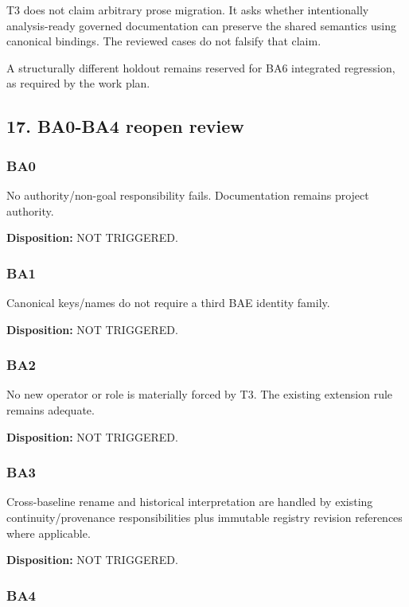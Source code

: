 \documentclass[
  10pt,
  a4paper,
]{article}
\begin{document}
T3 does not claim arbitrary prose migration. It asks whether
intentionally analysis-ready governed documentation can preserve the
shared semantics using canonical bindings. The reviewed cases do not
falsify that claim.

A structurally different holdout remains reserved for BA6 integrated
regression, as required by the work plan.

\subsection{17. BA0-BA4 reopen review}\label{17-ba0-ba4-reopen-review}

\subsubsection{BA0}\label{ba0}

No authority/non-goal responsibility fails. Documentation remains
project authority.

\textbf{Disposition:} NOT TRIGGERED.

\subsubsection{BA1}\label{ba1}

Canonical keys/names do not require a third BAE identity family.

\textbf{Disposition:} NOT TRIGGERED.

\subsubsection{BA2}\label{ba2}

No new operator or role is materially forced by T3. The existing
extension rule remains adequate.

\textbf{Disposition:} NOT TRIGGERED.

\subsubsection{BA3}\label{ba3}

Cross-baseline rename and historical interpretation are handled by
existing continuity/provenance responsibilities plus immutable registry
revision references where applicable.

\textbf{Disposition:} NOT TRIGGERED.

\subsubsection{BA4}\label{ba4}
\end{document}

